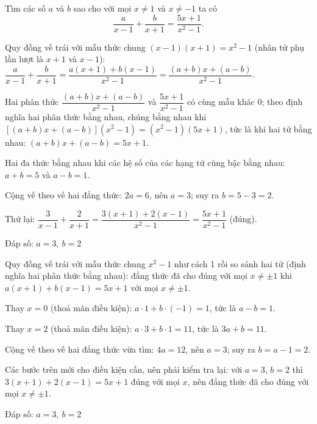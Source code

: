 \begin{problem}[8DS-PS-030]
Tìm các số $a$ và $b$ sao cho với mọi $x \neq 1$ và $x \neq -1$ ta có
\[ \dfrac{a}{x - 1} + \dfrac{b}{x + 1} = \dfrac{5x + 1}{x^2 - 1}. \]

\begin{solution}
Quy đồng vế trái với mẫu thức chung $(x - 1)(x + 1) = x^2 - 1$ (nhân tử phụ lần lượt là $x + 1$ và $x - 1$): $\dfrac{a}{x - 1} + \dfrac{b}{x + 1} = \dfrac{a(x + 1) + b(x - 1)}{x^2 - 1} = \dfrac{(a + b)x + (a - b)}{x^2 - 1}$.

Hai phân thức $\dfrac{(a + b)x + (a - b)}{x^2 - 1}$ và $\dfrac{5x + 1}{x^2 - 1}$ có cùng mẫu khác $0$; theo định nghĩa hai phân thức bằng nhau, chúng bằng nhau khi $[(a + b)x + (a - b)](x^2 - 1) = (x^2 - 1)(5x + 1)$, tức là khi hai tử bằng nhau: $(a + b)x + (a - b) = 5x + 1$.

Hai đa thức bằng nhau khi các hệ số của các hạng tử cùng bậc bằng nhau: $a + b = 5$ và $a - b = 1$.

Cộng vế theo vế hai đẳng thức: $2a = 6$, nên $a = 3$; suy ra $b = 5 - 3 = 2$.

Thử lại: $\dfrac{3}{x - 1} + \dfrac{2}{x + 1} = \dfrac{3(x + 1) + 2(x - 1)}{x^2 - 1} = \dfrac{5x + 1}{x^2 - 1}$ (đúng).

Đáp số: $\boxed{a = 3,\ b = 2}$
\end{solution}

\begin{solution}
Quy đồng vế trái với mẫu thức chung $x^2 - 1$ như cách 1 rồi so sánh hai tử (định nghĩa hai phân thức bằng nhau): đẳng thức đã cho đúng với mọi $x \neq \pm 1$ khi $a(x + 1) + b(x - 1) = 5x + 1$ với mọi $x \neq \pm 1$.

Thay $x = 0$ (thoả mãn điều kiện): $a \cdot 1 + b \cdot (-1) = 1$, tức là $a - b = 1$.

Thay $x = 2$ (thoả mãn điều kiện): $a \cdot 3 + b \cdot 1 = 11$, tức là $3a + b = 11$.

Cộng vế theo vế hai đẳng thức vừa tìm: $4a = 12$, nên $a = 3$; suy ra $b = a - 1 = 2$.

Các bước trên mới cho điều kiện cần, nên phải kiểm tra lại: với $a = 3$, $b = 2$ thì $3(x + 1) + 2(x - 1) = 5x + 1$ đúng với mọi $x$, nên đẳng thức đã cho đúng với mọi $x \neq \pm 1$.

Đáp số: $\boxed{a = 3,\ b = 2}$
\end{solution}
\end{problem}

